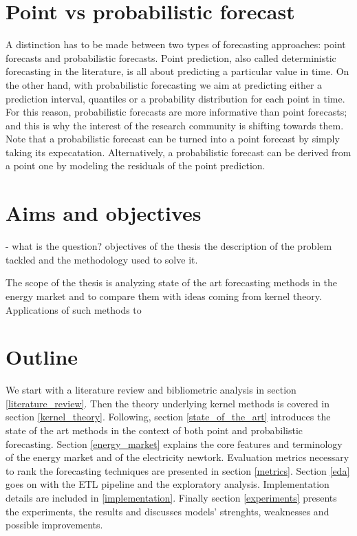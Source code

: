 \section{Point vs probabilistic forecast}
A distinction has to be made between two types of forecasting approaches: point forecasts and probabilistic forecasts.
Point prediction, also called deterministic forecasting in the literature, is all about predicting a particular value in time.
On the other hand, with probabilistic forecasting we aim at predicting either a prediction interval, quantiles or a probability distribution for each point in time. For this reason, probabilistic forecasts are more informative than point forecasts; and this is why the interest of the research community is shifting towards them.
Note that a probabilistic forecast can be turned into a point forecast by simply taking its expecatation.
Alternatively, a probabilistic forecast can be derived from a point one by modeling the residuals of the point prediction.



\section{Aims and objectives}

- what is the question? objectives of the thesis
the description of the problem tackled and the methodology used to solve
it.

The scope of the thesis is analyzing state of the art forecasting methods in the energy market and to compare them with ideas coming from kernel theory. Applications of such methods to 



\section{Outline}
We start with a literature review and bibliometric analysis in section \ref{literature_review}.
Then the theory underlying kernel methods is covered in section \ref{kernel_theory}. Following, section \ref{state_of_the_art} introduces the state of the art methods in the context of both point and probabilistic forecasting. Section \ref{energy_market} explains the core features and terminology of the energy market and of the electricity newtork.
Evaluation metrics necessary to rank the forecasting techniques are presented in section \ref{metrics}. Section \ref{eda} goes on with the ETL pipeline and the exploratory analysis. 
Implementation details are included in \ref{implementation}.
Finally section \ref{experiments} presents the experiments, the results and discusses models' strenghts, weaknesses and possible improvements.